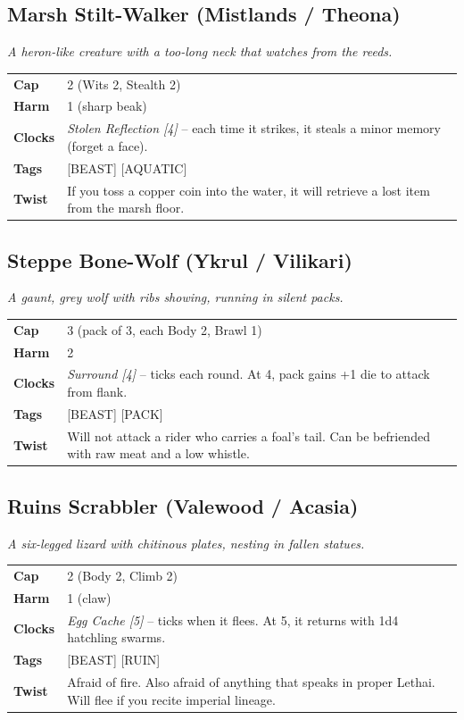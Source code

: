 \documentclass[10pt,twocolumn]{article}
\newcommand{\kw}[1]{\textbf{#1}}     %
\begin{document}
\subsection*{Marsh Stilt-Walker (Mistlands / Theona)}
\textit{A heron-like creature with a too-long neck that watches from the reeds.}
\begin{tabular}{@{}ll}
\toprule
\kw{Cap} & 2 (Wits 2, Stealth 2) \\
\kw{Harm} & 1 (sharp beak) \\
\kw{Clocks} & \textit{Stolen Reflection [4]} -- each time it strikes, it steals a minor memory (forget a face). \\
\kw{Tags} & [BEAST] [AQUATIC] \\
\kw{Twist} & If you toss a copper coin into the water, it will retrieve a lost item from the marsh floor. \\
\bottomrule
\end{tabular}

\subsection*{Steppe Bone-Wolf (Ykrul / Vilikari)}
\textit{A gaunt, grey wolf with ribs showing, running in silent packs.}
\begin{tabular}{@{}ll}
\toprule
\kw{Cap} & 3 (pack of 3, each Body 2, Brawl 1) \\
\kw{Harm} & 2 \\
\kw{Clocks} & \textit{Surround [4]} -- ticks each round. At 4, pack gains +1 die to attack from flank. \\
\kw{Tags} & [BEAST] [PACK] \\
\kw{Twist} & Will not attack a rider who carries a foal's tail. Can be befriended with raw meat and a low whistle. \\
\bottomrule
\end{tabular}

\subsection*{Ruins Scrabbler (Valewood / Acasia)}
\textit{A six-legged lizard with chitinous plates, nesting in fallen statues.}
\begin{tabular}{@{}ll}
\toprule
\kw{Cap} & 2 (Body 2, Climb 2) \\
\kw{Harm} & 1 (claw) \\
\kw{Clocks} & \textit{Egg Cache [5]} -- ticks when it flees. At 5, it returns with 1d4 hatchling swarms. \\
\kw{Tags} & [BEAST] [RUIN] \\
\kw{Twist} & Afraid of fire. Also afraid of anything that speaks in proper Lethai. Will flee if you recite imperial lineage. \\
\bottomrule
\end{tabular}
\end{document}
